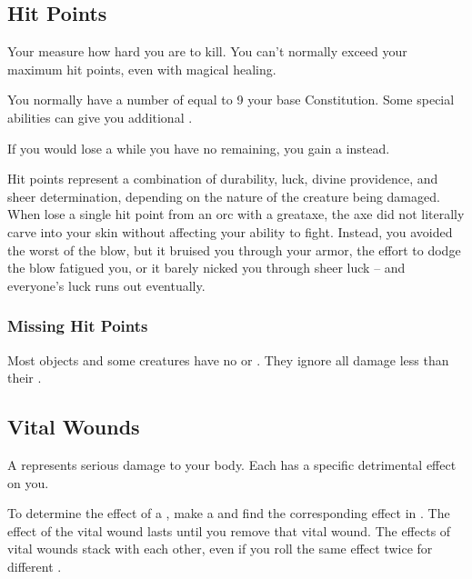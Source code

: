     \subsection{Hit Points}\label{Hit Points}
        Your  measure how hard you are to kill.
        You can't normally exceed your maximum hit points, even with magical healing.

        You normally have a number of  equal to 9 \add your base Constitution.
        Some special abilities can give you additional .

        If you would lose a  while you have no  remaining, you gain a  instead.

         Hit points represent a combination of durability, luck, divine providence, and sheer determination, depending on the nature of the creature being damaged.
        When lose a single hit point from an orc with a greataxe, the axe did not literally carve into your skin without affecting your ability to fight.
        Instead, you avoided the worst of the blow, but it bruised you through your armor, the effort to dodge the blow fatigued you, or it barely nicked you through sheer luck -- and everyone's luck runs out eventually.

        \subsubsection{Missing Hit Points}\label{Missing Hit Points}
            Most objects and some creatures have no  or .
            They ignore all damage less than their .

    \subsection{Vital Wounds}\label{Vital Wounds}
        A  represents serious damage to your body.
        Each  has a specific detrimental effect on you.

        To determine the effect of a , make a  and find the corresponding effect in .
        The effect of the vital wound lasts until you remove that vital wound.
        The effects of vital wounds stack with each other, even if you roll the same effect twice for different .

